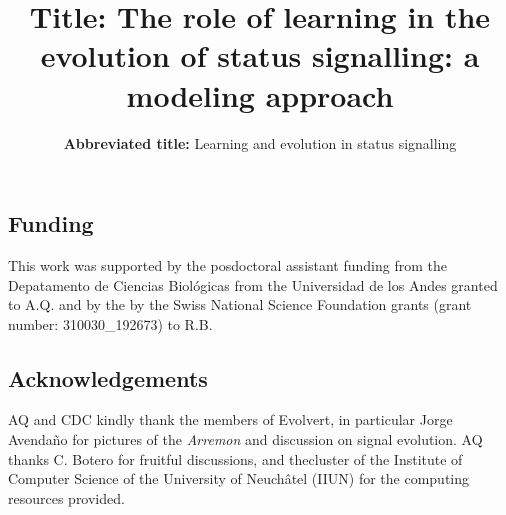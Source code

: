 \documentclass[
]{article}
\title{\large \textbf{Title:} The role of learning in the evolution of
status signalling: a modeling approach}
\subtitle{\normalsize \textbf{Abbreviated title:} Learning and evolution
in status signalling}
\date{}
\newcommand{\getIndex}[2]{
  \ForEach{,}{\IfEq{#1}{\thislevelitem}{\number\thislevelcount\ExitForEach}{}}{#2}
}
\newcommand{\getAff}[1]{
  \getIndex{#1}{a,b}
}
\begin{document}
\maketitle
{}

\hypertarget{funding}{%
\subsection{Funding}\label{funding}}

This work was supported by the posdoctoral assistant funding from the
Depatamento de Ciencias Biológicas from the Universidad de los Andes
granted to A.Q. and by the by the Swiss National Science Foundation
grants (grant number: 310030\_192673) to R.B.

\hypertarget{acknowledgements}{%
\subsection{Acknowledgements}\label{acknowledgements}}

AQ and CDC kindly thank the members of Evolvert, in particular Jorge
Avendaño for pictures of the \emph{Arremon} and discussion on signal
evolution. AQ thanks C. Botero for fruitful discussions, and thecluster
of the Institute of Computer Science of the University of Neuchâtel
(IIUN) for the computing resources provided.
\end{document}
